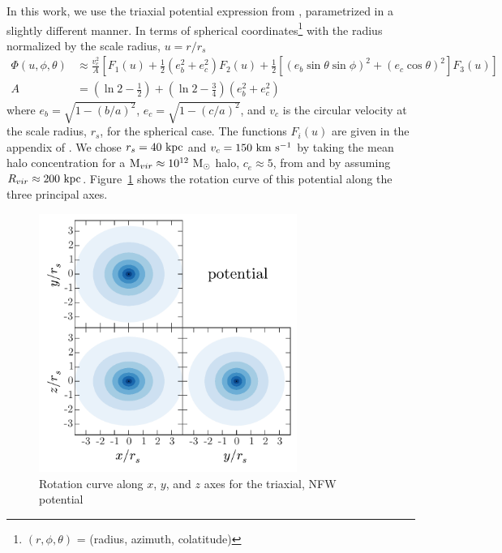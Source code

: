 \documentclass[letterpaper,12pt,preprint]{aastex}
\newcommand{\msun}{\mathrm{M}_\odot}
\begin{document}
In this work, we use the triaxial potential expression from \citet{leesuto03}, parametrized in a slightly different manner. In terms of spherical coordinates\footnote{$(r,\phi,\theta)$ = (radius, azimuth, colatitude)} with the radius normalized by the scale radius, $u = r/r_s$
\begin{align}
	\Phi(u,\phi,\theta) &\approx \frac{v_c^2}{A}\left[F_1(u) + \frac{1}{2}(e_b^2 + e_c^2)F_2(u) + \frac{1}{2} [(e_b\sin\theta \sin\phi)^2 + (e_c\cos\theta)^2] F_3(u) \right]\\
	A &= \left(\ln2 - \frac{1}{2}\right) + \left(\ln2-\frac{3}{4}\right) (e_b^2 + e_c^2)
\end{align}
where $e_b = \sqrt{1 - (b/a)^2}$, $e_c = \sqrt{1 - (c/a)^2}$, and $v_c$ is the circular velocity at the scale radius, $r_s$, for the spherical case. The functions $F_i(u)$ are given in the appendix of \cite{leesuto03}. We chose $r_s=40~{\rm kpc}$ and $v_c = 150~{\rm km}~{\rm s}^{-1}$ by taking the mean halo concentration for a ${\rm M}_{vir} \approx 10^{12}~\msun$ halo, $c_e\approx5$, from \cite{jing02} and by assuming $R_{vir}\approx200~{\rm kpc}$. Figure~\ref{fig:potential} shows the rotation curve of this potential along the three principal axes.

\begin{figure}[!h]
\begin{center}
\includegraphics[width=0.75\textwidth]{figures/potential.pdf}
\caption{Rotation curve along $x$, $y$, and $z$ axes for the triaxial, NFW potential } \label{fig:potential}
\end{center}
\end{figure}
\end{document}
